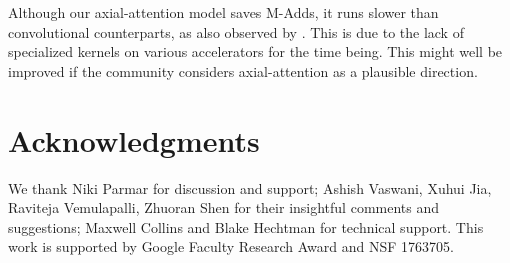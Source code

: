 \documentclass[runningheads]{llncs}
\begin{document}
Although our axial-attention model saves M-Adds, it runs slower than convolutional counterparts, as also observed by \cite{parmar2019stand}. This is due to the lack of specialized kernels on various accelerators for the time being. This might well be improved if the community considers axial-attention as a plausible direction.
 
\section*{Acknowledgments}
We thank Niki Parmar for discussion and support; Ashish Vaswani, Xuhui Jia, Raviteja Vemulapalli, Zhuoran Shen for their insightful comments and suggestions; Maxwell Collins and Blake Hechtman for technical support. This work is supported by Google Faculty Research Award and NSF 1763705.
\end{document}
